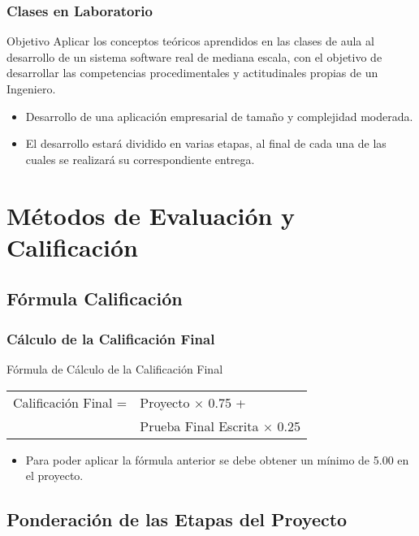 \documentclass[a4paper,t,xcolor=pst,dvips,colortheme]{beamer}
\begin{document}
\begin{frame}
	\frametitle{Clases en Laboratorio}
	\begin{block}{Objetivo}
        Aplicar los conceptos teóricos aprendidos en las clases de aula al desarrollo de un sistema software real de mediana escala, con el objetivo de desarrollar las competencias procedimentales y actitudinales propias de un Ingeniero.
	\end{block}
	\begin{itemize}
        \item<2-> Desarrollo de una aplicación empresarial de tamaño y complejidad moderada.
        \item<3-> El desarrollo estará dividido en varias etapas, al final de cada una de las cuales se realizará su correspondiente entrega.
	\end{itemize}
\end{frame}

\section{Métodos de Evaluación y Calificación}

\subsection{Fórmula Calificación}

\begin{frame}[c]
	\frametitle{Cálculo de la Calificación Final}
	\begin{block}{Fórmula de Cálculo de la Calificación Final}
		\begin{center}
        \begin{tabular}{ll}
			Calificación  Final  =  & Proyecto $\times$ 0.75 + \\
                                    & Prueba  Final  Escrita $\times$ 0.25 \\
		\end{tabular}
        \end{center}
	\end{block}
	\begin{itemize}
		\item<2-> Para poder aplicar la fórmula anterior se debe obtener un mínimo de 5.00 en el proyecto.
	\end{itemize}
\end{frame}

\subsection{Ponderación de las Etapas del Proyecto}
\end{document}
